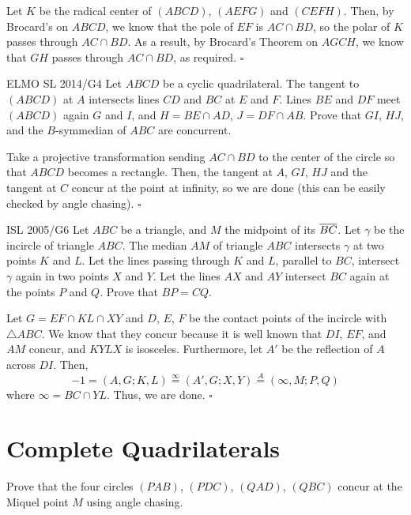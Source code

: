 \documentclass{article}
\begin{document}
Let $K$ be the radical center of $(ABCD)$, $(AEFG)$ and $(CEFH)$. Then, by Brocard's on $ABCD$, we know that the pole of $EF$ is $AC \cap BD$, so the polar of $K$ passes through $AC \cap BD$. As a result, by Brocard's Theorem on $AGCH$, we know that $GH$ passes through $AC \cap BD$, as required. $\square$

\newpage

\begin{problem}[9.57]{ELMO SL 2014/G4}
Let $ABCD$ be a cyclic quadrilateral. The tangent to $(ABCD)$ at $A$ intersects lines $CD$ and $BC$ at $E$ and $F$. Lines $BE$ and $DF$
meet $(ABCD)$ again $G$ and $I$, and $H = BE \cap AD$, $J = DF \cap AB$. Prove that $GI$, $HJ$, and the $B$-symmedian of $ABC$ are concurrent. 
\end{problem}

Take a projective transformation sending $AC \cap BD$ to the center of the circle so that $ABCD$ becomes a rectangle. Then, the tangent at $A$, $GI$, $HJ$ and the tangent at $C$ concur at the point at infinity, so we are done (this can be easily checked by angle chasing). $\square$

\begin{problem}[9.58]{ISL 2005/G6}
Let $ABC$ be a triangle, and $M$ the midpoint of its $\overline{BC}$. Let $\gamma$ be the incircle of triangle $ABC$. The median $AM$ of triangle $ABC$ intersects $\gamma$ at two points $K$ and $L$. Let the lines passing through $K$ and $L$, parallel to $BC$, intersect $\gamma$ again in two points $X$ and $Y$. Let the lines $AX$ and $AY$ intersect $BC$ again at the points $P$ and $Q$. Prove that $BP = CQ$.
\end{problem}

Let $G = EF \cap KL \cap XY$ and $D$, $E$, $F$ be the contact points of the incircle with $\triangle ABC$. We know that they concur because it is well known that $DI$, $EF$, and $AM$ concur, and $KYLX$ is isosceles. Furthermore, let $A'$ be the reflection of $A$ across $DI$. Then, \[-1 = (A,G;K,L) \stackrel{\infty}{=} (A', G; X, Y) \stackrel{A}{=} (\infty, M; P, Q)\] where $\infty = BC \cap YL$. Thus, we are done. $\square$

\newpage

\section{Complete Quadrilaterals}

\begin{problem}[10.4]{}
Prove that the four circles $(PAB)$, $(PDC)$, $(QAD)$, $(QBC)$ concur at the Miquel point $M$ using angle chasing. 
\end{problem}
\end{document}
